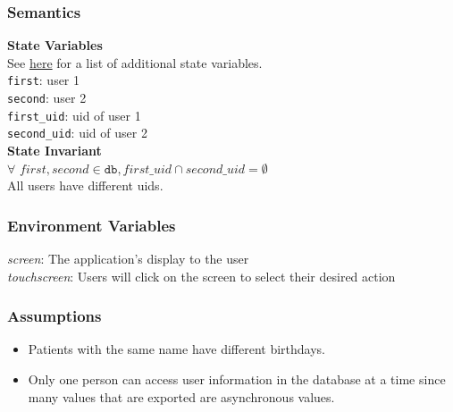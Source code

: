 \documentclass[12pt, titlepage]{article}
\begin{document}
\subsubsection{Semantics}
\noindent \textbf{State Variables} \\
See \hyperlink{acexpprogs}{here} for a list of additional state variables.\\
\texttt{first}: user 1\\
\texttt{second}: user 2\\
\texttt{first\_uid}: uid of user 1\\
\texttt{second\_uid}: uid of user 2\\

\noindent \textbf{State Invariant} \\
$\forall$ $first, second \in \texttt{db}, first\_uid \cap second\_uid = \emptyset $\\
All users have different uids.\\

\subsubsection{Environment Variables}
\textit{screen}: The application's display to the user \\
\textit{touchscreen}: Users will click on the screen to select their desired action

\subsubsection{Assumptions}
\begin{itemize}
  \item Patients with the same name have different birthdays.
  \item Only one person can access user information in the database at a time since many values that are exported are asynchronous values.
\end{itemize}
\end{document}
